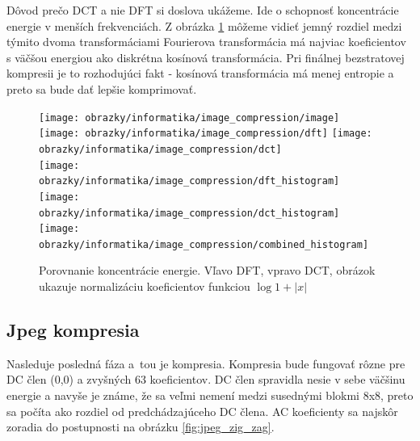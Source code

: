  Dôvod  prečo DCT a nie DFT si doslova ukážeme.
 Ide o schopnosť koncentrácie energie
 v menších frekvenciách. Z obrázka \ref{fig:dct_vs_dft}
 môžeme vidieť jemný rozdiel medzi týmito dvoma transformáciami
 Fourierova transformácia má najviac koeficientov s väčšou energiou
 ako diskrétna kosínová transformácia. Pri finálnej
 bezstratovej kompresii je to rozhodujúci fakt - kosínová
 transformácia má menej entropie a preto sa bude dať lepšie
 komprimovať.
\begin{figure}[htp]
    \centering
    \texttt{[image: obrazky/informatika/image\_compression/image]} \\
    \texttt{[image: obrazky/informatika/image\_compression/dft]}
    \texttt{[image: obrazky/informatika/image\_compression/dct]} \\
    \texttt{[image: obrazky/informatika/image\_compression/dft\_histogram]}
    \texttt{[image: obrazky/informatika/image\_compression/dct\_histogram]}
    \texttt{[image: obrazky/informatika/image\_compression/combined\_histogram]}
    \caption{Porovnanie koncentrácie energie. Vľavo DFT, vpravo DCT,
    obrázok ukazuje normalizáciu koeficientov funkciou $\log 1+|x|$}
    \label{fig:dct_vs_dft}
\end{figure}


\subsection{Jpeg kompresia }
Nasleduje posledná fáza a~tou je kompresia. Kompresia bude fungovať
rôzne pre DC člen (0,0) a zvyšných 63 koeficientov. DC člen spravidla nesie v
sebe väčšinu energie a navyše je známe, že sa veľmi nemení medzi
susednými blokmi 8x8, preto sa počíta ako rozdiel od predchádzajúceho
DC člena. AC koeficienty sa najskôr zoradia do 
postupnosti na obrázku \ref{fig:jpeg_zig_zag}. 

